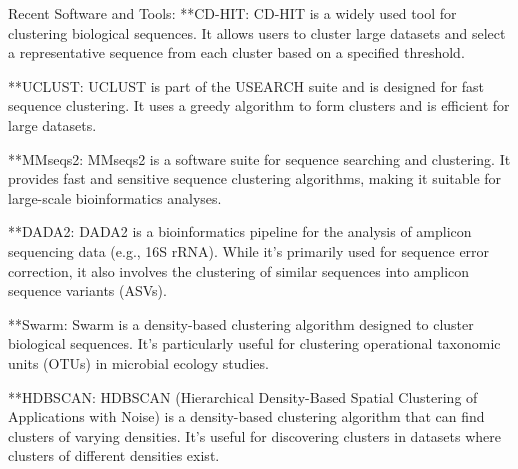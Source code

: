 Recent Software and Tools:
**CD-HIT: CD-HIT is a widely used tool for clustering biological sequences. It allows users to cluster large datasets and select a representative sequence from each cluster based on a specified threshold.

**UCLUST: UCLUST is part of the USEARCH suite and is designed for fast sequence clustering. It uses a greedy algorithm to form clusters and is efficient for large datasets.

**MMseqs2: MMseqs2 is a software suite for sequence searching and clustering. It provides fast and sensitive sequence clustering algorithms, making it suitable for large-scale bioinformatics analyses.

**DADA2: DADA2 is a bioinformatics pipeline for the analysis of amplicon sequencing data (e.g., 16S rRNA). While it's primarily used for sequence error correction, it also involves the clustering of similar sequences into amplicon sequence variants (ASVs).

**Swarm: Swarm is a density-based clustering algorithm designed to cluster biological sequences. It's particularly useful for clustering operational taxonomic units (OTUs) in microbial ecology studies.

**HDBSCAN: HDBSCAN (Hierarchical Density-Based Spatial Clustering of Applications with Noise) is a density-based clustering algorithm that can find clusters of varying densities. It's useful for discovering clusters in datasets where clusters of different densities exist.